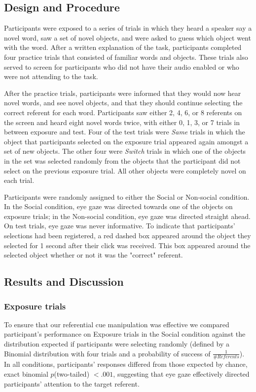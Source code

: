 \documentclass[10pt,letterpaper]{article}
\begin{document}
\subsection{Design and Procedure}
Participants were exposed to a series of trials in which they heard a speaker say a novel word, 
saw a set of novel objects, and were asked to guess which object went with the word. 
After a written explanation of the task, participants completed four practice trials that consisted of 
familiar words and objects. These trials also served to screen for participants
who did not have their audio enabled or who were not attending to the task.

After the practice trials, participants were informed that they would now hear
novel words, and see novel objects, and that they should continue selecting the correct
referent for each word. Participants saw either 2, 4, 6, or 8 referents on
the screen and heard eight novel words twice, with either 0, 1, 3, or 7 trials in between exposure and test. Four of the test trials were \textit{Same} trials in which the object that participants selected on the exposure trial appeared again amongst a set of new objects. 
The other four were \textit{Switch} trials in which one of the objects in the set was selected 
randomly from the objects that the participant did not select on the previous exposure trial. 
All other objects were completely novel on each trial. 

Participants were randomly assigned to either the Social or Non-social condition. In the Social condition, eye gaze was directed towards one of the objects on exposure trials; in the Non-social condition, eye gaze was directed straight ahead. On test trials, eye gaze was never informative. To indicate that participants' selections had been registered, a red dashed box appeared around the object they selected for 1 second after their click was received. This box appeared around the selected object whether or not it was the "correct" referent.

\subsection{Results and Discussion}

\subsubsection{Exposure trials}

To ensure that our referential cue manipulation was effective we compared participant's performance on Exposure trials in the Social condition against the distribution expected if participants were selecting randomly (defined by a Binomial distribution with four trials and a probability of success of $\frac{1}{\# Referents}$). In all conditions, participants' responses differed from those expected by chance, exact binomial  $p$(two-tailed) $< .001$, suggesting that eye gaze effectively directed participants' attention to the target referent. 
\end{document}
